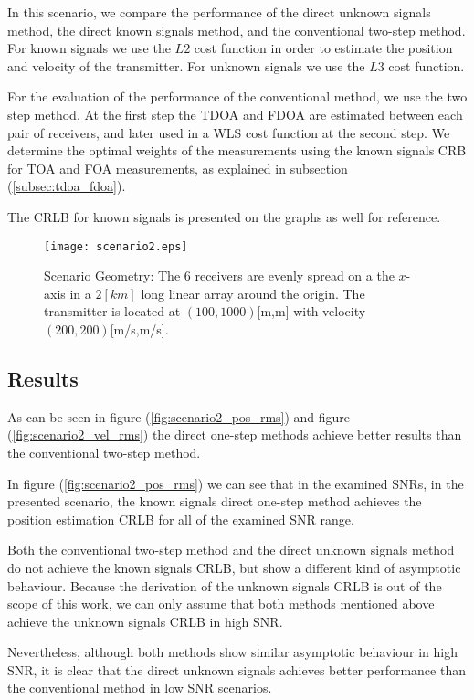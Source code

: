 In this scenario, we compare the performance of the direct unknown signals method, the direct known signals method, and the conventional two-step method.
For known signals we use the $L2$ cost function in order to estimate the position and velocity of the transmitter. For unknown signals we use the $L3$ cost function.

For the evaluation of the performance of the conventional method, we use the two step method.
At the first step the TDOA and FDOA are estimated between each pair of receivers, and later used in a WLS cost function at the second step. We determine the optimal weights of the measurements using the known signals CRB for TOA and FOA measurements, as explained in subsection (\ref{subsec:tdoa_fdoa}).

The CRLB for known signals is presented on the graphs as well for reference.

\begin{figure}
\begin{center}
\texttt{[image: scenario2.eps]} 
\end{center}
\caption{Scenario Geometry: The 6 receivers are evenly spread on a the $x$-axis in a $2[km]$ long linear array around the origin. The transmitter is located at $(100,1000)$[m,m] with velocity $(200,200)$[m/s,m/s].}
\label{fig:scenario2_geometry}
\end{figure}


\subsection*{Results}
As can be seen in figure (\ref{fig:scenario2_pos_rms}) and figure (\ref{fig:scenario2_vel_rms}) the direct one-step methods achieve better results than the conventional two-step method.

In figure (\ref{fig:scenario2_pos_rms}) we can see that in the examined SNRs, in the presented scenario, the known signals direct one-step method achieves the position estimation CRLB for all of the examined SNR range.

Both the conventional two-step method and the direct unknown signals method do not achieve the known signals CRLB, but show a different kind of asymptotic behaviour. Because the derivation of the unknown signals CRLB is out of the scope of this work, we can only assume that both methods mentioned above achieve the unknown signals CRLB in high SNR. 

Nevertheless, although both methods show similar asymptotic behaviour in high SNR, it is clear that the direct unknown signals achieves better performance than the conventional method in low SNR scenarios.

